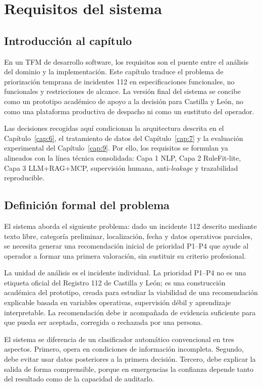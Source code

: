 \chapter{Requisitos del sistema}
\label{cap:5}

\section{Introducción al capítulo}

En un TFM de desarrollo software, los requisitos son el puente entre el análisis del dominio y la implementación. Este capítulo traduce el problema de priorización temprana de incidentes 112 en especificaciones funcionales, no funcionales y restricciones de alcance. La versión final del sistema se concibe como un prototipo académico de apoyo a la decisión para Castilla y León, no como una plataforma productiva de despacho ni como un sustituto del operador.

Las decisiones recogidas aquí condicionan la arquitectura descrita en el Capítulo~\ref{cap:6}, el tratamiento de datos del Capítulo~\ref{cap:7} y la evaluación experimental del Capítulo~\ref{cap:9}. Por ello, los requisitos se formulan ya alineados con la línea técnica consolidada: Capa 1 NLP, Capa 2 RuleFit-lite, Capa 3 LLM+RAG+MCP, supervisión humana, anti-\textit{leakage} y trazabilidad reproducible.

\section{Definición formal del problema}

El sistema aborda el siguiente problema: dado un incidente 112 descrito mediante texto libre, categoría preliminar, localización, fecha y datos operativos parciales, se necesita generar una recomendación inicial de prioridad P1--P4 que ayude al operador a formar una primera valoración, sin sustituir su criterio profesional.

La unidad de análisis es el incidente individual. La prioridad P1--P4 no es una etiqueta oficial del Registro 112 de Castilla y León; es una construcción académica del prototipo, creada para estudiar la viabilidad de una recomendación explicable basada en variables operativas, supervisión débil y aprendizaje interpretable. La recomendación debe ir acompañada de evidencia suficiente para que pueda ser aceptada, corregida o rechazada por una persona.

El sistema se diferencia de un clasificador automático convencional en tres aspectos. Primero, opera en condiciones de información incompleta. Segundo, debe evitar usar datos posteriores a la primera decisión. Tercero, debe explicar la salida de forma comprensible, porque en emergencias la confianza depende tanto del resultado como de la capacidad de auditarlo.


